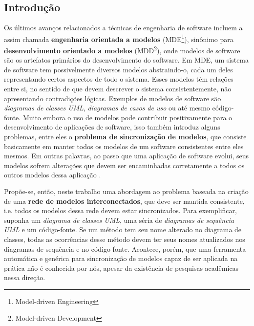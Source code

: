\documentclass[cic,resumo-unibral]{iiufrgs}
\begin{document}
\begin{extendedsummary}

\section{Introdução}
Os últimos avanços relacionados a técnicas de engenharia de software incluem a assim chamada \textbf{engenharia orientada a modelos} (MDE\footnote{Model-driven Engineering}), sinônimo para \textbf{desenvolvimento orientado a modelos} (MDD\footnote{Model-driven Development}), onde modelos de software são os artefatos primários do desenvolvimento do software. Em MDE, um sistema de software tem possivelmente diversos modelos abstraindo-o, cada um deles representando certos aspectos de todo o sistema. Esses modelos têm relações entre si, no sentido de que devem descrever o sistema consistentemente, não apresentando contradições lógicas. Exemplos de modelos de software são \emph{diagramas de classes UML}, \emph{diagramas de casos de uso} ou até mesmo código-fonte. Muito embora o uso de modelos pode contribuir positivamente para o desenvolvimento de aplicações de software, isso também introduz alguns problemas, entre eles o \textbf{problema de sincronização de modelos}, que consiste basicamente em manter todos os modelos de um software consistentes entre eles mesmos. Em outras palavras, ao passo que uma aplicação de software evolui, seus modelos sofrem alterações que devem ser encaminhadas corretamente a todos os outros modelos dessa aplicação \cite{diskin2011model}.

Propõe-se, então, neste trabalho uma abordagem ao problema baseada na criação de uma \textbf{rede de modelos interconectados}, que deve ser mantida consistente, i.e. todos os modelos dessa rede devem estar sincronizados. Para exemplificar, suponha um \emph{diagrama de classes UML}, uma séria de \emph{diagramas de sequência UML} e um código-fonte. Se um método tem seu nome alterado no diagrama de classes, todas as ocorrências desse método devem ter seus nomes atualizados nos diagramas de sequência e no código-fonte. Acontece, porém, que uma ferramenta automática e genérica para sincronização de modelos capaz de ser aplicada na prática não é conhecida por nós, apesar da existência de pesquisas acadêmicas nessa direção.


\end{extendedsummary}
\end{document}
